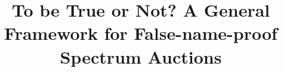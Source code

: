 \documentclass{sig-alternate}
\begin{document}
%

\title{To be True or Not? A General Framework for False-name-proof Spectrum Auctions}
%
%
%
%
%
\end{document}
